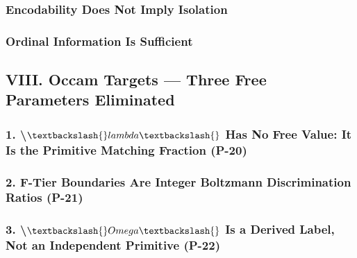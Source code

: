 \documentclass{article[11pt,letterpaper]}
\begin{document}
\subsubsection{Encodability Does Not Imply Isolation}
\label{sec:encodability-does-not-imply-isolation}


\subsubsection{Ordinal Information Is Sufficient}
\label{sec:ordinal-information-is-sufficient}


\subsection{VIII. Occam Targets — Three Free Parameters Eliminated}
\label{sec:viii-occam-targets--three-free-parameters-eliminat}


\subsubsection{1. \textbackslash{}$\textbackslash{}lambda\textbackslash{}$ Has No Free Value: It Is the Primitive Matching Fraction (P-20)}
\label{sec:1-lambda-has-no-free-value-it-is-the-primitive-mat}


\subsubsection{2. F-Tier Boundaries Are Integer Boltzmann Discrimination Ratios (P-21)}
\label{sec:2-f-tier-boundaries-are-integer-boltzmann-discrimi}


\subsubsection{3. \textbackslash{}$\textbackslash{}Omega\textbackslash{}$ Is a Derived Label, Not an Independent Primitive (P-22)}
\label{sec:3-omega-is-a-derived-label-not-an-independent-prim}
\end{document}
